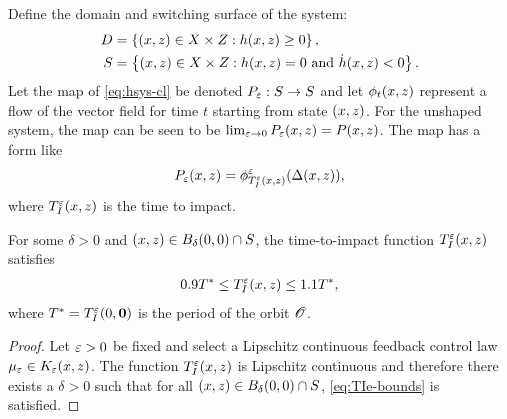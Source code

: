 \documentclass[twocolumn]{article}
\begin{document}
Define the domain and switching surface of the system:
\begin{align}
  D &= \left\{ (x, z) \in X \times Z : h(x, z) \geq 0 \right\},\\
  \nonumber
  S &= \left\{ (x, z) \in X \times Z : h(x, z) = 0 \mbox{ and } {\dot h}(x, z) < 0 \right\}.
\end{align}
Let the \Poincare{} map of \eqref{eq:hsys-cl} be denoted $P_{\varepsilon} : S \to S$ and let $\phi_{t}(x, z)$ represent a flow of the vector field for time $t$ starting from state $(x, z)$.
%
For the unshaped system, the \Poincare{} map can be seen to be $\lim_{\varepsilon \to 0} P_{\varepsilon}(x, z) = P(x, z)$.
%
The \Poincare{} map has a form like
\begin{align}
  P_{\varepsilon}(x, z) = \phi^{\varepsilon}_{T_{I}^{\varepsilon}(x, z)}(\Delta(x, z)),
\end{align}
where $T_{I}^{\varepsilon}(x, z)$ is the time to impact.

\begin{lemma}
  \label{lemma:TIe-bounds}
  For some $\delta > 0$ and $(x, z) \in B_{\delta}(0, 0) \cap S$, the time-to-impact function $T_{I}^{\varepsilon}(x, z)$ satisfies
  \begin{align}
    \label{eq:TIe-bounds}
    0.9 T^{*} \leq T_{I}^{\varepsilon}(x, z) \leq 1.1 T^{*},
  \end{align}
  where $T^{*} = T_{I}^{\varepsilon}(0, {\mathbf 0})$ is the period of the orbit ${\mathscr O}$.
\end{lemma}
\begin{proof}
  Let $\varepsilon > 0$ be fixed and select a Lipschitz continuous feedback control law $\mu_{\varepsilon} \in K_{\varepsilon}(x, z)$. The function $T_{I}^{\varepsilon}(x, z)$ is Lipschitz continuous and therefore there exists a $\delta > 0$ such that for all $(x, z) \in B_{\delta}(0, 0) \cap S$, \eqref{eq:TIe-bounds} is satisfied.
\end{proof}
\end{document}
